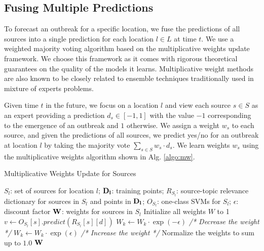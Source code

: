 \documentclass[twoside,leqno,twocolumn]{article}
\begin{document}
\subsection{Fusing Multiple Predictions}
\label{sec:integration}
To forecast an outbreak for a specific location, we fuse the predictions of all sources into a single prediction for each location $l \in L$ at time $t$. We use a weighted majority voting algorithm based on the multiplicative weights update framework\cite{arora:2012}. We choose this framework as it comes with rigorous theoretical guarantees on the quality of the models it learns. Multiplicative weight methods are also known to be closely related to ensemble techniques traditionally used in mixture of experts problems.

Given time $t$ in the future, we focus on a location $l$ and view each source $s \in S$ as an expert providing a prediction $d_s \in [-1,1]$ with the value $-1$ corresponding to the emergence of an outbreak and $1$ otherwise. We assign a weight $w_s$ to each source, and given the predictions of all sources, we predict yes/no for an outbreak at location $l$ by taking the majority vote $\sum_{s \in S} w_s \cdot d_s$.  We learn weights $w_s$ using the multiplicative weights algorithm shown in Alg. \ref{algo:mw}.

\begin{algorithm}[h]
\centering
\captionsetup{font=small}
\caption{Multiplicative Weights Update for Sources}
\begin{algorithmic}[1]
 $S_l$: set of sources for location $l$; ${\bf D_l}$: training points; $R_{S_l}$: source-topic relevance dictionary for sources in $S_l$ and points in ${\bf D_l}$; $O_{S_l}$: one-class SVMs for $S_l$; $\epsilon$: discount factor
 $\bf{W}$: weights for sources in $S_l$
\STATE Initialize all weights $W$ to 1
	\STATE $v \leftarrow O_{S_l}[s].predict(R_{S_l}[s][d])$
		\STATE  $W_k \leftarrow W_k\cdot \exp(-\epsilon)$ {\em /* Decrease the weight */}
	\ELSE
		\STATE $W_k \leftarrow W_k\cdot \exp(\epsilon)$ {\em /* Increase the weight */}
	\ENDIF
	\ENDFOR	
	\STATE Normalize the weights to sum up to $1.0$
\ENDFOR
\RETURN ${\bf W}$
\end{algorithmic}
\label{algo:mw}
\end{algorithm}
\end{document}
